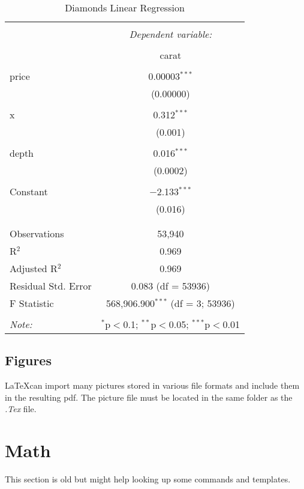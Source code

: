 \documentclass[a4paper]{scrartcl}
\begin{document}
	\begin{table}[!htbp] \centering 
		\caption{Diamonds Linear Regression} 
		\label{diamondsreg} 
		\begin{tabular}{@{\extracolsep{5pt}}lc} 
			\\[-1.8ex]\hline 
			\hline \\[-1.8ex] 
			& \multicolumn{1}{c}{\textit{Dependent variable:}} \\ 
			\cline{2-2} 
			\\[-1.8ex] & carat \\ 
			\hline \\[-1.8ex] 
			price & 0.00003$^{***}$ \\ 
			& (0.00000) \\ 
			& \\ 
			x & 0.312$^{***}$ \\ 
			& (0.001) \\ 
			& \\ 
			depth & 0.016$^{***}$ \\ 
			& (0.0002) \\ 
			& \\ 
			Constant & $-$2.133$^{***}$ \\ 
			& (0.016) \\ 
			& \\ 
			\hline \\[-1.8ex] 
			Observations & 53,940 \\ 
			R$^{2}$ & 0.969 \\ 
			Adjusted R$^{2}$ & 0.969 \\ 
			Residual Std. Error & 0.083 (df = 53936) \\ 
			F Statistic & 568,906.900$^{***}$ (df = 3; 53936) \\ 
			\hline 
			\hline \\[-1.8ex] 
			\textit{Note:}  & \multicolumn{1}{r}{$^{*}$p$<$0.1; $^{**}$p$<$0.05; $^{***}$p$<$0.01} \\ 
		\end{tabular} 
	\end{table}
	
	\subsection{Figures}
\LaTeX can import many pictures stored in various file formats and include them in the resulting pdf. The picture file must be located in the same folder as the \emph{.Tex} file.

		\newpage
	\section{Math} \label{form}
	This section is old but might help looking up some commands and templates.
	
\end{document}
